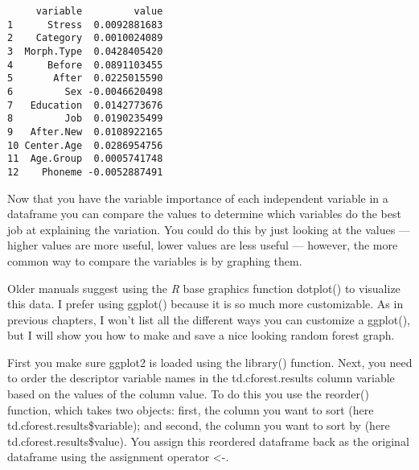 \documentclass[
  10pt,
  letterpaper]{article}
\newenvironment{Shaded}{\begin{snugshade}}{\end{snugshade}}
\newcommand{\CommentTok}[1]{\textcolor[rgb]{0.37,0.37,0.37}{#1}}
\newcommand{\FunctionTok}[1]{\textcolor[rgb]{0.28,0.35,0.67}{#1}}
\newcommand{\NormalTok}[1]{\textcolor[rgb]{0.00,0.23,0.31}{#1}}
\newcommand{\OtherTok}[1]{\textcolor[rgb]{0.00,0.23,0.31}{#1}}
\newcommand{\SpecialCharTok}[1]{\textcolor[rgb]{0.37,0.37,0.37}{#1}}
\renewcommand\texttt[1]{{\ttfamily\color{BrickRed}#1}}
\begin{document}
\begin{verbatim}
     variable         value
1      Stress  0.0092881683
2    Category  0.0010024089
3  Morph.Type  0.0428405420
4      Before  0.0891103455
5       After  0.0225015590
6         Sex -0.0046620498
7   Education  0.0142773676
8         Job  0.0190235499
9   After.New  0.0108922165
10 Center.Age  0.0286954756
11  Age.Group  0.0005741748
12    Phoneme -0.0052887491
\end{verbatim}

Now that you have the variable importance of each independent variable
in a dataframe you can compare the values to determine which variables
do the best job at explaining the variation. You could do this by just
looking at the values --- higher values are more useful, lower values
are less useful --- however, the more common way to compare the
variables is by graphing them.

Older manuals suggest using the \emph{R} base graphics function
\texttt{dotplot()} to visualize this data. I prefer using
\texttt{ggplot()} because it is so much more customizable. As in
previous chapters, I won't list all the different ways you can customize
a \texttt{ggplot()}, but I will show you how to make and save a nice
looking random forest graph.

\begin{Shaded}
\end{Shaded}

First you make sure \texttt{ggplot2} is loaded using the
\texttt{library()} function. Next, you need to order the descriptor
variable names in the \texttt{td.cforest.results} column
\texttt{variable} based on the values of the column \texttt{value}. To
do this you use the \texttt{reorder()} function, which takes two
objects: first, the column you want to sort (here
\texttt{td.cforest.results\$variable}); and second, the column you want
to sort by (here \texttt{td.cforest.results\$value}). You assign this
reordered dataframe back as the original dataframe using the assignment
operator \texttt{\textless{}-}.
\end{document}
